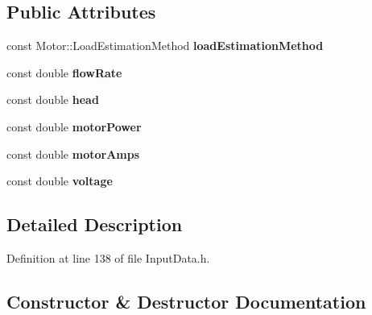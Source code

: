 \subsection*{Public Attributes}
\begin{DoxyCompactItemize}
\item 
\mbox{\label{struct_pump_1_1_field_data_a26ec49662d5866c00ddb8df278261321}} 
const Motor\+::\+Load\+Estimation\+Method {\bfseries load\+Estimation\+Method}
\item 
\mbox{\label{struct_pump_1_1_field_data_a84c512ac749541c91b2fbe6d3f971182}} 
const double {\bfseries flow\+Rate}
\item 
\mbox{\label{struct_pump_1_1_field_data_abc76e0e2dc15fb4d97fbe39405912e60}} 
const double {\bfseries head}
\item 
\mbox{\label{struct_pump_1_1_field_data_a2b39c288d86eda22190818bbf1672d28}} 
const double {\bfseries motor\+Power}
\item 
\mbox{\label{struct_pump_1_1_field_data_a9610ce4050705dfad60b159e6dec8bfa}} 
const double {\bfseries motor\+Amps}
\item 
\mbox{\label{struct_pump_1_1_field_data_a2b09518966e012112d44c78439ef28ba}} 
const double {\bfseries voltage}
\end{DoxyCompactItemize}


\subsection{Detailed Description}


Definition at line 138 of file Input\+Data.\+h.



\subsection{Constructor \& Destructor Documentation}
\mbox{\label{struct_pump_1_1_field_data_ad35a6b6b9a02174c0e32ed6adebb8b75}} 
